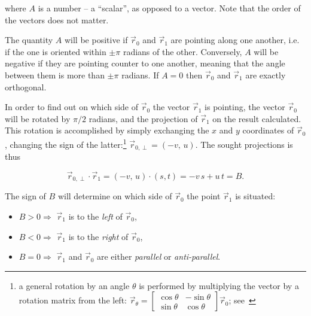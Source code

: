\documentclass[]{article} %
\begin{document}
\noindent where $A$ is a number -- a ``scalar'', as opposed to a vector.
Note that the order of the vectors does not matter.

The quantity $A$ will be positive if $\vec{r}_0$ and $\vec{r}_1$ are pointing along one another, i.e. if the one is oriented within $\pm\pi$ radians of the other.
Conversely, $A$ will be negative if they are pointing counter to one another, meaning that the angle between them is more than $\pm\pi$ radians.
If $A=0$ then $\vec{r}_0$ and $\vec{r}_1$ are exactly orthogonal.

In order to find out on which side of $\vec{r}_0$ the vector $\vec{r}_1$ is pointing, the vector $\vec{r}_0$ will be rotated by $\pi/2$ radians, and the projection of $\vec{r}_1$ on the result calculated.
This rotation is accomplished by simply exchanging the $x$ and $y$ coordinates of $\vec{r}_0$, changing the sign of the latter:\footnote{a general rotation by an angle $\theta$ is performed by multiplying the vector by a rotation matrix from the left: $\vec{r}_\theta = \begin{bmatrix}\cos \theta & -\sin \theta \\ \sin \theta & \cos \theta \end{bmatrix}\vec{r}_0$; see~\cite{Beta}}
$\vec{r}_{0,\perp}=\left(-v,\, u\right)$.
The sought projections is thus

\begin{equation}
 \label{eq:perp_projection}
 \vec{r}_{0,\perp} \cdot \vec{r}_1 = \left(-v,\, u\right) \cdot \left(s, t\right) = -v\,s + u\,t = B.
\end{equation}

The sign of $B$ will determine on which side of $\vec{r}_0$ the point $\vec{r}_1$ is situated:
\begin{itemize}
 \item $B > 0 \Longrightarrow$ $\vec{r}_1$ is to the \emph{left} of $\vec{r}_0$,
 \item $B < 0 \Longrightarrow$ $\vec{r}_1$ is to the \emph{right} of $\vec{r}_0$,
 \item $B = 0 \Longrightarrow$ $\vec{r}_1$ and $\vec{r}_0$ are either \emph{parallel} or \emph{anti-parallel}.
\end{itemize}
\end{document}
